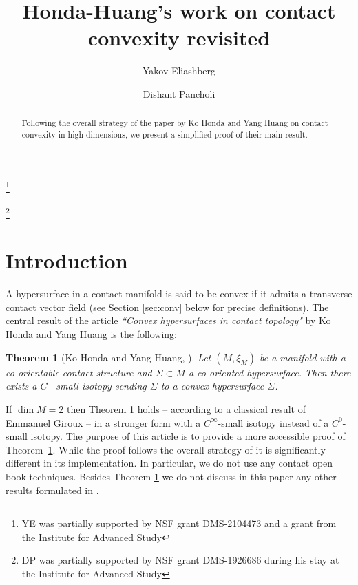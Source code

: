 \documentclass[12pt]{amsart}
\theoremstyle{plain}
\newtheorem{theorem}{Theorem}[section]
\theoremstyle{definition}
\theoremstyle{remark}
\begin{document}
 
  
  \title{Honda-Huang's work on contact convexity revisited}
\author{Yakov Eliashberg }
\address{Department of Mathematics\\Stanford University \\ Stanford, CA 94305 USA}
\thanks{YE was partially supported by NSF grant DMS-2104473 and a grant from the Institute
for Advanced Study}

\author{Dishant Pancholi}
\address{The Institute of Mathematical Sciences\\
Taramani,
Chennai 600 113,
Tamil Nadu, India}
 \thanks{DP was partially supported by NSF grant DMS-1926686 during his stay at the Institute for Advanced Study}	 


\begin{abstract}
Following the overall strategy  of the paper \cite{HH} by  Ko Honda and Yang  Huang on contact convexity in high dimensions,  we present  a simplified proof of their main result.
\end{abstract}
\maketitle



\section{Introduction}

A hypersurface in a contact manifold is said to be convex  if it admits  a transverse contact vector field  (see Section \ref{sec:conv} below for precise definitions). The central   result of  the article \emph{``Convex hypersurfaces in contact topology"} by  Ko Honda and Yang Huang is  the following:
\begin{theorem}[Ko Honda and Yang Huang,   \cite{HH}]\label{thm:HH}
Let $(M, \xi_M)$ be a manifold with a co-orientable contact structure and $\Sigma\subset M$    a  co-oriented hypersurface. Then there exists a $C^0$--small isotopy sending $\Sigma$ to a convex
 hypersurface $\widetilde{\Sigma}$.
\end{theorem}

If $\dim M=2$ then Theorem \ref{thm:HH} holds -- according to a classical result of Emmanuel Giroux \cite{Gi} -- in a stronger form  with a $C^\infty$-small 
isotopy instead of a $C^0$-small isotopy.  The purpose of this article is to provide a   more accessible  proof of Theorem~\ref{thm:HH}. While the proof  follows  the overall strategy of  \cite{HH}  it is  significantly  different in  its implementation. In particular, we do not use any contact open  book techniques. Besides Theorem \ref{thm:HH} we do not discuss  in this paper any other results formulated in \cite{HH}.
 \medskip
 
\end{document}
